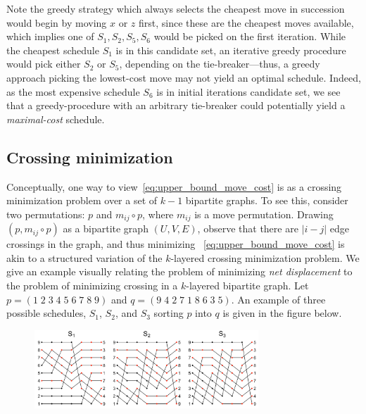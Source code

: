 \documentclass[sn-mathphys]{sn-jnl}
\begin{document}
Note the greedy strategy which always selects the cheapest move in succession would begin by moving $x$ or $z$ first, since these are the cheapest moves available, which implies one of $S_1, S_2, S_5, S_6$ would be picked on the first iteration. While the cheapest schedule $S_1$ is in this candidate set, an iterative greedy procedure would pick either $S_2$ or $S_5$, depending on the tie-breaker---thus, a greedy approach picking the lowest-cost move may not yield an optimal schedule. 
	Indeed, as the most expensive schedule $S_6$ is in initial iterations candidate set, we see that a greedy-procedure with an arbitrary tie-breaker could potentially yield a \emph{maximal-cost} schedule.  

\subsection{Crossing minimization}\label{sec:cross_minimization}
Conceptually, one way to view~\eqref{eq:upper_bound_move_cost} is as a crossing minimization problem over a set of $k-1$ bipartite graphs. To see this, consider two permutations: $p$ and $m_{ij} \circ p$, where $m_{ij}$ is a move permutation. 
Drawing $(p, m_{ij} \circ p)$ as a bipartite graph $(U, V, E)$, observe that there are $\lvert i - j \rvert$ edge crossings in the graph, and thus minimizing ~\eqref{eq:upper_bound_move_cost} is akin to a  structured variation of the $k$-layered crossing minimization problem.
We give an example visually relating the problem of minimizing \emph{net displacement} to the problem of minimizing crossing in a $k$-layered bipartite graph. 
Let  $p= (1\;2\;3\;4\;5\;6\;7\;8\;9)$ and $q = (9\;4\;2\;7\;1\;8\;6\;3\;5)$.
An example of three possible schedules, $S_1$, $S_2$, and $S_3$ sorting $p$ into $q$ is given in the figure below. 
\begin{figure}[!htb]
    \centering
    \includegraphics[width=0.75\textwidth]{crossings.png} %
    \label{fig:crossings}
\end{figure}
\end{document}
